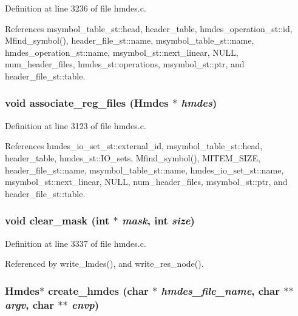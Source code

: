Definition at line 3236 of file hmdes.c.

References msymbol\_\-table\_\-st::head, header\_\-table, hmdes\_\-operation\_\-st::id, Mfind\_\-symbol(), header\_\-file\_\-st::name, msymbol\_\-table\_\-st::name, hmdes\_\-operation\_\-st::name, msymbol\_\-st::next\_\-linear, NULL, num\_\-header\_\-files, hmdes\_\-st::operations, msymbol\_\-st::ptr, and header\_\-file\_\-st::table.
\subsubsection{\setlength{\rightskip}{0pt plus 5cm}void associate\_\-reg\_\-files (\bf{Hmdes} $\ast$ {\em hmdes})}\label{hmdes_8h_d97bc6015f7945e01a4eede7f79ae0d1}




Definition at line 3123 of file hmdes.c.

References hmdes\_\-io\_\-set\_\-st::external\_\-id, msymbol\_\-table\_\-st::head, header\_\-table, hmdes\_\-st::IO\_\-sets, Mfind\_\-symbol(), MITEM\_\-SIZE, header\_\-file\_\-st::name, msymbol\_\-table\_\-st::name, hmdes\_\-io\_\-set\_\-st::name, msymbol\_\-st::next\_\-linear, NULL, num\_\-header\_\-files, msymbol\_\-st::ptr, and header\_\-file\_\-st::table.
\subsubsection{\setlength{\rightskip}{0pt plus 5cm}void clear\_\-mask (int $\ast$ {\em mask}, int {\em size})}\label{hmdes_8h_88f18e1a13f5f5d2b335ab3b5de0c127}




Definition at line 3337 of file hmdes.c.

Referenced by write\_\-lmdes(), and write\_\-res\_\-node().
\subsubsection{\setlength{\rightskip}{0pt plus 5cm}\bf{Hmdes}$\ast$ create\_\-hmdes (char $\ast$ {\em hmdes\_\-file\_\-name}, char $\ast$$\ast$ {\em argv}, char $\ast$$\ast$ {\em envp})}\label{hmdes_8h_3157c981faa1f80fffce64fe8a1685b2}




